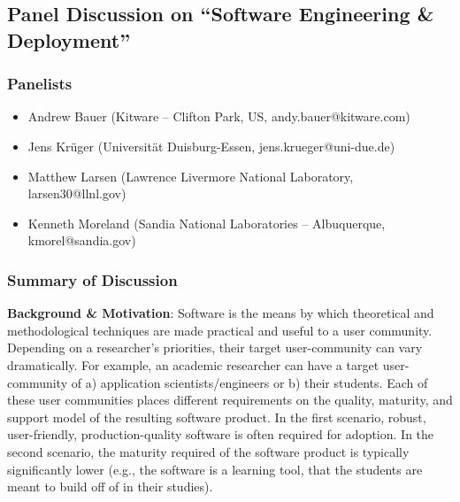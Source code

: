 \subsection{Panel Discussion on ``Software Engineering \& Deployment''}

\subsubsection{Panelists}

\begin{itemize}
\item Andrew Bauer (Kitware -- Clifton Park, US, andy.bauer@kitware.com)
\item Jens Krüger  (Universität Duisburg-Essen, jens.krueger@uni-due.de)
\item Matthew Larsen (Lawrence Livermore National Laboratory, larsen30@llnl.gov)
\item Kenneth Moreland (Sandia National Laboratories -- Albuquerque, kmorel@sandia.gov)
\end{itemize}

%
%
%
%
%
%

\subsubsection{Summary of Discussion}

\textbf{Background \& Motivation}: Software is the means by which theoretical and methodological techniques are made practical and useful to a user community.  Depending on a researcher’s priorities, their target user-community can vary dramatically.  For example, an academic researcher can have a target user-community of a) application scientists/engineers or b) their students.  Each of these user communities places different requirements on the quality, maturity, and support model of the resulting software product.  In the first scenario, robust, user-friendly, production-quality software is often required for adoption.  In the second scenario, the maturity required of the software product is typically significantly lower (e.g., the software is a learning tool, that the students are meant to build off of in their studies).  

